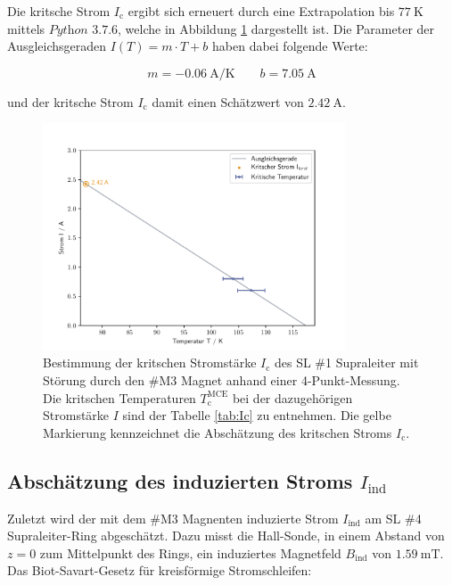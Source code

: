 \noindent
Die kritsche Strom $I_{\text{c}}$ ergibt sich erneuert durch eine Extrapolation
bis $\SI{77}{\kelvin}$ mittels $\textit{Python 3.7.6}$, welche in Abbildung
\ref{fig:Ic2} dargestellt ist. Die Parameter der Ausgleichsgeraden
$I(T)=m\cdot T + b$ haben dabei folgende Werte:

\begin{equation*}
	m = \SI{-0.06}{\ampere\per\kelvin}
	\qquad
	b = \SI{7.05}{\ampere}
	\label{AF5}
\end{equation*}

\noindent
und der kritsche Strom $I_{\text{c}}$ damit einen Schätzwert von $\SI{2.42}{\ampere}$.

\begin{figure}[H]
    \centering
    \includegraphics[width=0.8\textwidth]{Auswertung/I_krit_Pt_b/I_krit.pdf}
    \caption{Bestimmung der kritschen Stromstärke $I_{\text{c}}$ des SL \#1
		Supraleiter mit Störung durch den \#M3 Magnet anhand einer 4-Punkt-Messung.
		Die kritschen Temperaturen $T^{\text{MCE}}_{\text{c}}$
		bei der dazugehörigen Stromstärke $I$ sind der Tabelle \ref{tab:Ic} zu entnehmen.
		Die gelbe Markierung kennzeichnet die Abschätzung des kritschen Stroms $I_{\text{c}}$.}
\label{fig:Ic2}
\end{figure}

\subsection{Abschätzung des induzierten Stroms $I_{\text{ind}}$}
\label{sec:ind}
Zuletzt wird der mit dem \#M3 Magnenten induzierte Strom $I_{\text{ind}}$ am SL
\#4 Supraleiter-Ring abgeschätzt. Dazu misst die Hall-Sonde, in einem Abstand von
$z=0$ zum Mittelpunkt des Rings, ein induziertes Magnetfeld $B_{\text{ind}}$ von
$\SI{1,59}{\milli\tesla}$. Das Biot-Savart-Gesetz für kreisförmige Stromschleifen:

